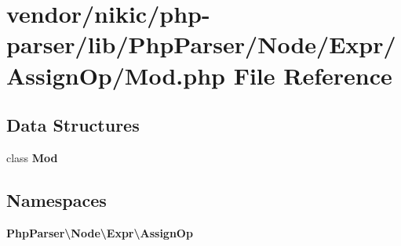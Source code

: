 \section{vendor/nikic/php-\/parser/lib/\+Php\+Parser/\+Node/\+Expr/\+Assign\+Op/\+Mod.php File Reference}
\label{_assign_op_2_mod_8php}
\subsection*{Data Structures}
\begin{DoxyCompactItemize}
\item 
class {\bf Mod}
\end{DoxyCompactItemize}
\subsection*{Namespaces}
\begin{DoxyCompactItemize}
\item 
 {\bf Php\+Parser\textbackslash{}\+Node\textbackslash{}\+Expr\textbackslash{}\+Assign\+Op}
\end{DoxyCompactItemize}
